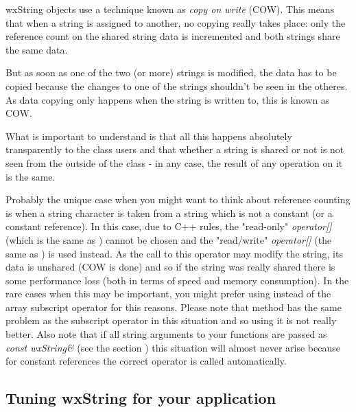 wxString objects use a technique known as {\it copy on write} (COW). This means
that when a string is assigned to another, no copying really takes place: only
the reference count on the shared string data is incremented and both strings
share the same data.

But as soon as one of the two (or more) strings is modified, the data has to be
copied because the changes to one of the strings shouldn't be seen in the
otheres. As data copying only happens when the string is written to, this is
known as COW.

What is important to understand is that all this happens absolutely
transparently to the class users and that whether a string is shared or not is
not seen from the outside of the class - in any case, the result of any
operation on it is the same.

Probably the unique case when you might want to think about reference
counting is when a string character is taken from a string which is not a
constant (or a constant reference). In this case, due to C++ rules, the
"read-only" {\it operator[]} (which is the same as 
) cannot be chosen and the "read/write" 
{\it operator[]} (the same as 
) is used instead. As the
call to this operator may modify the string, its data is unshared (COW is done)
and so if the string was really shared there is some performance loss (both in
terms of speed and memory consumption). In the rare cases when this may be
important, you might prefer using  instead
of the array subscript operator for this reasons. Please note that 
 method has the same problem as the subscript operator in
this situation and so using it is not really better. Also note that if all
string arguments to your functions are passed as {\it const wxString\&} (see the
section ) this situation will almost
never arise because for constant references the correct operator is called automatically.

\subsection{Tuning wxString for your application}\label{wxstringtuning}


